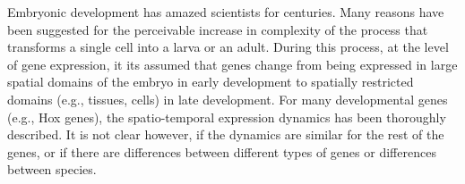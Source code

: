 
Embryonic development has amazed scientists for centuries.
%
Many reasons have been suggested for the perceivable increase in complexity of the process that transforms a single cell into a larva or an adult.
%
%
During this process, at the level of gene expression, 
it its assumed that genes change from being expressed in large spatial domains of the embryo in early development to spatially restricted domains (e.g., tissues, cells) in late development.
%
For many developmental genes (e.g., Hox genes), the spatio-temporal expression dynamics
has been thoroughly described.
It is not clear however, if the dynamics are similar for the rest of the genes,
or if there are differences between different types of genes or differences between species.


